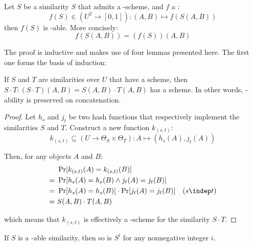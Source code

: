 
\begin{theorem} \label{thm:pgfcompsim}
    Let $S$ be a similarity $S$ that admits a \lsh-scheme, and $f$ a \pgf:
    \[
        f(S) \in (U^2 \to [0, 1]) : (A, B) \mapsto f(S(A, B))
    \]
    then $f(S)$ is \lsh-able. More concisely:
    \[
        f(S(A, B)) = (f(S)) (A, B)
    \]
\end{theorem}


The proof is inductive and makes use of four lemmas presented here. The first one forms the basis of induction:


\begin{lemma}\label{lem:pgfcomp}
    If $S$ and $T$ are similarities over $U$ that have a scheme, then $S \cdot T : (S \cdot T)(A, B) = S(A, B) \cdot T(A, B)$ has a scheme. In other words, \lsh-ability is preserved on concatenation.
\end{lemma}

\begin{proof}
    Let $h_s$ and $j_t$ be two hash functions that respectively implement the similarities $S$ and $T$. Construct a new function $k_{(s, t)}$:
    \[
        k_{(s, t)} \subseteq (U \to \Theta_S \times \Theta_T) : A \mapsto (h_s(A), j_t(A))
    \]

    Then, for any objects $A$ and $B$:
    \begin{align*}
         &\ \Pr[k_{(s, t)}(A) = k_{(s, t)}(B)]              & \\
        =&\ \Pr[h_s(A) = h_s(B) \wedge j_t(A) = j_t(B)]     & \\
        =&\ \Pr[h_s(A) = h_s(B)] \cdot \Pr[j_t(A) = j_t(B)] & (s \indep t) \\
        =&\ S(A, B) \cdot T(A, B)                           &
    \end{align*}

    which means that $k_{(s, t)}$ is effectively a \lsh-scheme for the similarity $S \cdot T$.
\end{proof}

\begin{lemma}\label{l:powersim}
    If $S$ is a \lsh-able similarity, then so is $S^i$ for any nonnegative integer $i$.
\end{lemma}

